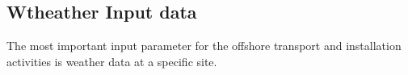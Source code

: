 \subsection{Wtheather Input data}

The most important input parameter for the offshore transport and installation activities is weather data at a specific site. 